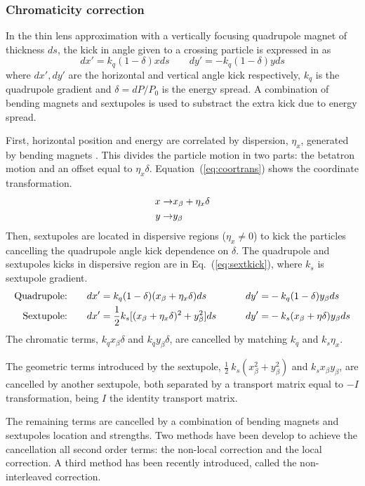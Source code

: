 \subsubsection{Chromaticity correction}\label{s:chromcorr}
In the thin lens approximation with a vertically focusing quadrupole magnet of thickness $ds$, the kick in angle given to a crossing particle is expressed in \cite{CAS9104} as
\begin{equation}
 dx'=k_q(1-\delta)xds\qquad dy'=-k_q(1-\delta)yds
\end{equation}
where $dx', dy'$ are the horizontal and vertical angle kick respectively, $k_q$ is the quadrupole gradient and $\delta=dP/P_0$ is the energy spread. A combination of bending magnets and sextupoles is used to substract the extra kick due to energy spread.\par
First, horizontal position and energy are correlated by dispersion, $\eta_x$, generated by bending magnets \cite{CAS9104}. This divides the particle motion in two parts: the betatron motion and an offset equal to $\eta_x\delta$. Equation~(\ref{eq:coortrans}) shows the coordinate transformation.
\begin{align}
 x\rightarrow& x_\beta + \eta_x \delta\label{eq:coortrans}\\
 y\rightarrow& y_\beta\notag
\end{align}
Then, sextupoles are located in dispersive regions ($\eta_x\neq0$) to kick the particles cancelling the quadrupole angle kick dependence on $\delta$. The quadrupole and sextupoles kicks in dispersive region are in Eq.~(\ref{eq:sextkick}), where $k_s$ is sextupole gradient.
\begin{align}
 \text{Quadrupole:}&\qquad dx'=k_q(1-\delta)(x_\beta+\eta_x\delta)ds\qquad& dy'=&-k_q(1-\delta)y_\beta ds \label{eq:sextkick}\\
 \text{Sextupole:}&\qquad dx'=\frac{1}{2}k_s[(x_\beta+\eta_x\delta)^2+y_\beta^2]ds\qquad& dy'=&-k_s(x_\beta+\eta\delta)y_\beta ds\notag
\end{align}
The chromatic terms, $k_q x_\beta\delta$ and $k_q y_\beta\delta$, are cancelled by matching $k_q$ and $k_s\eta_x$.\par
The geometric terms introduced by the sextupole, $\frac{1}{2}~k_s(x^2_\beta+y^2_\beta)$ and $k_sx_\beta y_\beta$, are cancelled by another sextupole, both separated by a transport matrix equal to $-I$ transformation, being $I$ the identity transport matrix.\par
The remaining terms are cancelled by a combination of bending magnets and sextupoles location and strengths. Two methods have been develop to achieve the cancellation all second order terms: the non-local correction and the local correction. A third method has been recently introduced, called the non-interleaved correction.\par
